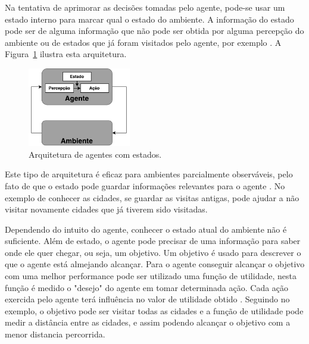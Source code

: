 Na tentativa de aprimorar as decisões tomadas pelo agente, pode-se usar um estado interno para marcar qual o estado do ambiente. A informação do estado pode ser de alguma informação que não pode ser obtida por alguma percepção do ambiente ou de estados que já foram visitados pelo agente, por exemplo \cite{intelligence2003modern}. A Figura~\ref{fig:agenteModelbased} ilustra esta arquitetura. 

\begin{figure}[ht]
	\centering
	\includegraphics[width=0.4\textwidth]{fig/agentModel.pdf}
	\caption{Arquitetura de agentes com estados.}
	\label{fig:agenteModelbased}
\end{figure} 

Este tipo de arquitetura é eficaz para ambientes parcialmente observáveis, pelo fato de que o estado pode guardar informações relevantes para o agente \cite{intelligence2003modern}. No exemplo de conhecer as cidades, se guardar as visitas antigas, pode ajudar a não visitar novamente cidades que já tiverem sido visitadas. 

Dependendo do intuito do agente, conhecer o estado atual do ambiente não é suficiente. Além de estado, o agente pode precisar de uma informação para saber onde ele quer chegar, ou seja, um objetivo. Um objetivo é usado para descrever o que o agente está almejando alcançar. Para o agente conseguir alcançar o objetivo com uma melhor performance pode ser utilizado uma função de utilidade, nesta função é medido o "desejo" do agente em tomar determinada ação. Cada ação exercida pelo agente terá influência no valor de utilidade obtido \cite{intelligence2003modern}. Seguindo no exemplo, o objetivo pode ser visitar todas as cidades e a função de utilidade pode medir a distância entre as cidades, e assim podendo alcançar o objetivo com a menor distancia percorrida. 



